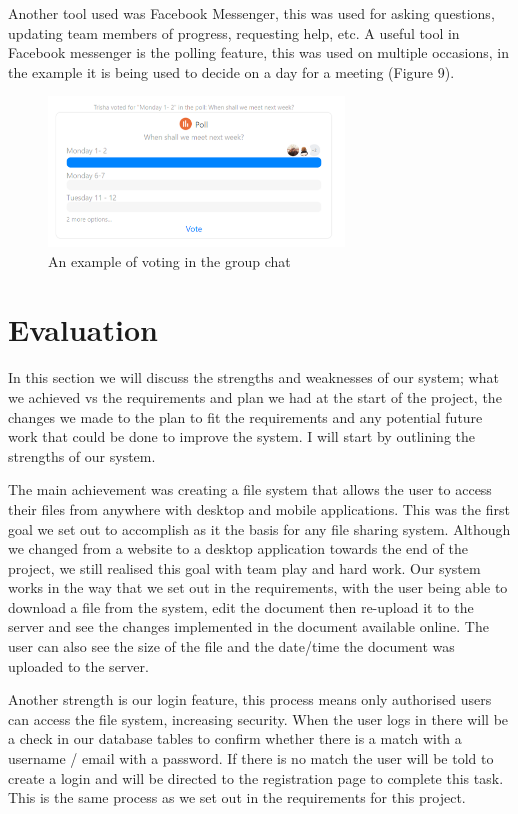 \documentclass[11pt]{article}
\begin{document}
Another tool used was Facebook Messenger, this was used for asking questions, updating team members of progress, requesting help, etc. A useful tool in Facebook messenger is the polling feature, this was used on multiple occasions, in the example it is being used to decide on a day for a meeting (Figure 9). 

\begin{figure} [H]
\caption{An example of voting in the group chat}
\centering
\includegraphics[width=0.7\textwidth]{figure3.PNG}
\end{figure}

\section{Evaluation}

In this section we will discuss the strengths and weaknesses of our system; what we achieved vs the requirements and plan we had at the start of the project, the changes we made to the plan to fit the requirements and any potential future work that could be done to improve the system. I will start by outlining the strengths of our system. 

The main achievement was creating a file system that allows the user to access their files from anywhere with desktop and mobile applications. This was the first goal we set out to accomplish as it the basis for any file sharing system. Although we changed from a website to a desktop application towards the end of the project, we still realised this goal with team play and hard work. Our system works in the way that we set out in the requirements, with the user being able to download a file from the system, edit the document then re-upload it to the server and see the changes implemented in the document available online. The user can also see the size of the file and the date/time the document was uploaded to the server.

Another strength is our login feature, this process means only authorised users can access the file system, increasing security. When the user logs in there will be a check in our database tables to confirm whether there is a match with a username / email with a password. If there is no match the user will be told to create a login and will be directed to the registration page to complete this task. This is the same process as we set out in the requirements for this project.
\end{document}
